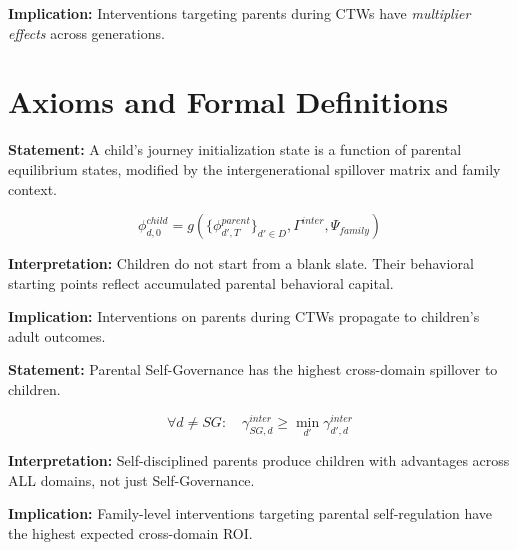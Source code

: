 \textbf{Implication:} Interventions targeting parents during CTWs have \textit{multiplier effects}
across generations.


\section{Axioms and Formal Definitions}
\label{sec:BI-axioms}

\begin{tcolorbox}[colback=gray!5!white, colframe=gray!75!black,
    title=Axiom BI-1: Behavioral Inheritance]
\textbf{Statement:} A child's journey initialization state is a function of parental equilibrium states,
modified by the intergenerational spillover matrix and family context.

\begin{equation}
\phi^{child}_{d,0} = g\left(\{\phi^{parent}_{d',T}\}_{d' \in D}, \Gamma^{inter}, \Psi_{family}\right)
\end{equation}

\textbf{Interpretation:} Children do not start from a blank slate. Their behavioral starting points
reflect accumulated parental behavioral capital.

\textbf{Implication:} Interventions on parents during CTWs propagate to children's adult outcomes.
\end{tcolorbox}

\begin{tcolorbox}[colback=gray!5!white, colframe=gray!75!black,
    title=Axiom BI-2: Self-Governance Primacy]
\textbf{Statement:} Parental Self-Governance has the highest cross-domain spillover to children.

\begin{equation}
\forall d \neq SG: \quad \gamma^{inter}_{SG,d} \geq \min_{d'} \gamma^{inter}_{d',d}
\end{equation}

\textbf{Interpretation:} Self-disciplined parents produce children with advantages across ALL domains,
not just Self-Governance.

\textbf{Implication:} Family-level interventions targeting parental self-regulation have the highest
expected cross-domain ROI.
\end{tcolorbox}

